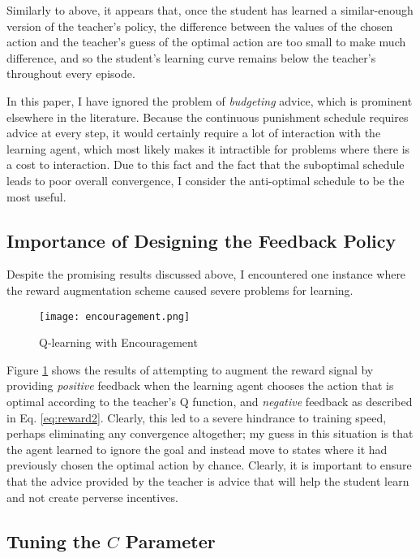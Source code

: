 \documentclass[twocolumn]{article}
\begin{document}
Similarly to above, it appears that, once the student has learned a
similar-enough version of the teacher's policy, the difference between
the values of the chosen action and the teacher's guess of the optimal
action are too small to make much difference, and so the student's
learning curve remains below the teacher's throughout every episode.

In this paper, I have ignored the problem of \emph{budgeting} advice,
which is prominent elsewhere in the literature. Because the continuous
punishment schedule requires advice at every step, it would certainly
require a lot of interaction with the learning agent, which most likely
makes it intractible for problems where there is a cost to interaction.
Due to this fact and the fact that the suboptimal schedule leads to poor
overall convergence, I consider the anti-optimal schedule to be the most
useful.

\hypertarget{importance-of-designing-the-feedback-policy}{\subsection{Importance of Designing the Feedback
Policy}\label{importance-of-designing-the-feedback-policy}}

Despite the promising results discussed above, I encountered one
instance where the reward augmentation scheme caused severe problems for
learning.

\begin{figure}
\hypertarget{fig:enc}{\centering
\texttt{[image: encouragement.png]}
\caption{Q-learning with Encouragement}\label{fig:enc}
}
\end{figure}

Figure \ref{fig:enc} shows the results of attempting to augment the
reward signal by providing \emph{positive} feedback when the learning
agent chooses the action that is optimal according to the teacher's Q
function, and \emph{negative} feedback as described in Eq.
\ref{eq:reward2}. Clearly, this led to a severe hindrance to training
speed, perhaps eliminating any convergence altogether; my guess in this
situation is that the agent learned to ignore the goal and instead move
to states where it had previously chosen the optimal action by chance.
Clearly, it is important to ensure that the advice provided by the
teacher is advice that will help the student learn and not create
perverse incentives.

\hypertarget{tuning-the-c-parameter}{\subsection{\texorpdfstring{Tuning the \(C\)
Parameter}{Tuning the C Parameter}}\label{tuning-the-c-parameter}}
\end{document}
